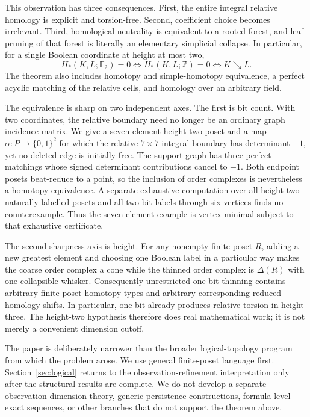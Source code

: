 \documentclass[11pt]{article}
\theoremstyle{definition}
\theoremstyle{remark}
\newcommand{\Z}{\mathbb Z}
\newcommand{\Ftwo}{\mathbb F_2}
\newcommand{\D}{\Delta}
\newcommand{\searrowrel}{\mathrel{\searrow}}
\begin{document}
This observation has three consequences.  First, the entire integral relative homology
is explicit and torsion-free.  Second, coefficient choice becomes irrelevant.  Third,
homological neutrality is equivalent to a rooted forest, and leaf pruning of that
forest is literally an elementary simplicial collapse.  In particular, for a single
Boolean coordinate at height at most two,
\[
\boxed{
  H_*(K,L;\Ftwo)=0
  \iff H_*(K,L;\Z)=0
  \iff K\searrowrel L.
}
\]
The theorem also includes homotopy and simple-homotopy equivalence, a perfect acyclic
matching of the relative cells, and homology over an arbitrary field.

The equivalence is sharp on two independent axes.  The first is bit count.  With two
coordinates, the relative boundary need no longer be an ordinary graph incidence
matrix.  We give a seven-element height-two poset and a map
$\alpha:P\to\{0,1\}^2$ for which the relative $7\times7$ integral boundary has
determinant $-1$, yet no deleted edge is initially free.  The support graph has three
perfect matchings whose signed determinant contributions cancel to $-1$.  Both endpoint
posets beat-reduce to a point, so the inclusion of order complexes is nevertheless a
homotopy equivalence.  A separate exhaustive computation over all height-two naturally
labelled posets and all two-bit labels through six vertices finds no counterexample.
Thus the seven-element example is vertex-minimal subject to that exhaustive certificate.

The second sharpness axis is height.  For any nonempty finite poset $R$, adding a new
greatest element and choosing one Boolean label in a particular way makes the coarse
order complex a cone while the thinned order complex is $\D(R)$ with one collapsible
whisker.  Consequently unrestricted one-bit thinning contains arbitrary finite-poset
homotopy types and arbitrary corresponding reduced homology shifts.  In particular,
one bit already produces relative torsion in height three.  The height-two hypothesis
therefore does real mathematical work; it is not merely a convenient dimension cutoff.

The paper is deliberately narrower than the broader logical-topology program from which
the problem arose.  We use general finite-poset language first.  Section~\ref{sec:logical}
returns to the observation-refinement interpretation only after the structural results
are complete.  We do not develop a separate observation-dimension theory, generic
persistence constructions, formula-level exact sequences, or other branches that do
not support the theorem above.
\end{document}
